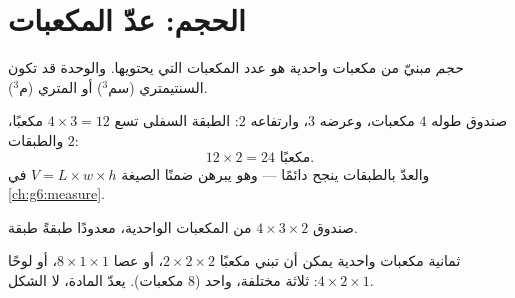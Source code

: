 \section{الحجم: عدّ المكعبات}

\begin{definition}\label{def:g5:solids:volume}
\emph{حجم}  مبنيّ من مكعبات واحدية هو
عدد المكعبات التي يحتويها. والوحدة قد تكون  السنتيمتري
(سم$^3$) أو  المتري (م$^3$).
\end{definition}

\begin{example}\label{ex:g5:solids:layers}
صندوق طوله $4$ مكعبات، وعرضه $3$، وارتفاعه $2$: الطبقة السفلى
تسع $4 \times 3 = 12$ مكعبًا، والطبقات $2$:
\[
12 \times 2 = 24 \text{ مكعبًا} .
\]
والعدّ بالطبقات ينجح دائمًا --- وهو يبرهن ضمنًا الصيغة
$V = L \times w \times h$ في \cref{ch:g6:measure}.
\end{example}

\begin{omfigure}

{\small صندوق $4 \times 3 \times 2$ من المكعبات الواحدية، معدودًا
طبقةً طبقة.}
\end{omfigure}

\begin{example}\label{ex:g5:solids:rearrange}
ثمانية مكعبات واحدية يمكن أن تبني مكعبًا $2 \times 2 \times 2$، أو
عصا $8 \times 1 \times 1$، أو لوحًا $4 \times 2 \times 1$: ثلاثة
 مختلفة،  واحد ($8$ مكعبات).  يعدّ
المادة، لا الشكل.
\end{example}

